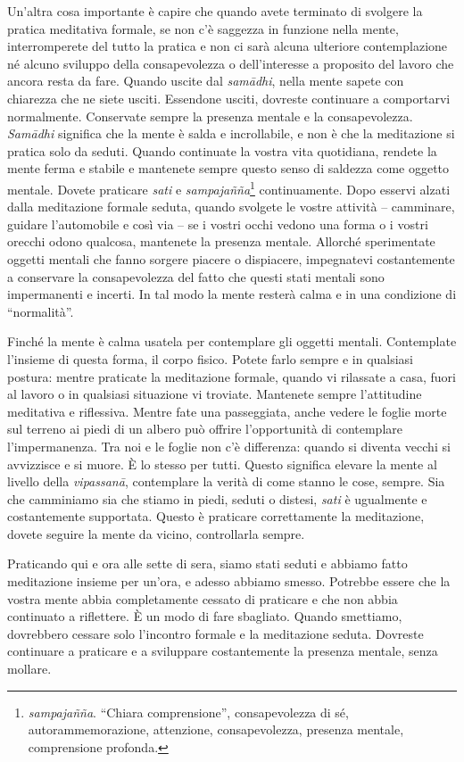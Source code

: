 Un'altra cosa importante è capire che quando avete terminato di svolgere
la pratica meditativa formale, se non c'è saggezza in funzione nella
mente, interromperete del tutto la pratica e non ci sarà alcuna
ulteriore contemplazione né alcuno sviluppo della consapevolezza o
dell'interesse a proposito del lavoro che ancora resta da fare. Quando
uscite dal \emph{samādhi}, nella mente sapete con chiarezza che ne siete
usciti. Essendone usciti, dovreste continuare a comportarvi normalmente.
Conservate sempre la presenza mentale e la consapevolezza.
\emph{Samādhi} significa che la mente è salda e incrollabile, e non è
che la meditazione si pratica solo da seduti. Quando continuate la
vostra vita quotidiana, rendete la mente ferma e stabile e mantenete
sempre questo senso di saldezza come oggetto mentale. Dovete praticare
\emph{sati} e \emph{sampajañña}\footnote{\emph{sampajañña}. ``Chiara
  comprensione'', consapevolezza di sé, autorammemorazione, attenzione,
  consapevolezza, presenza mentale, comprensione profonda.}
continuamente. Dopo esservi alzati dalla meditazione formale seduta,
quando svolgete le vostre attività -- camminare, guidare l'automobile e
così via -- se i vostri occhi vedono una forma o i vostri orecchi odono
qualcosa, mantenete la presenza mentale. Allorché sperimentate oggetti
mentali che fanno sorgere piacere o dispiacere, impegnatevi
costantemente a conservare la consapevolezza del fatto che questi stati
mentali sono impermanenti e incerti. In tal modo la mente resterà calma
e in una condizione di ``normalità''.

Finché la mente è calma usatela per contemplare gli oggetti mentali.
Contemplate l'insieme di questa forma, il corpo fisico. Potete farlo
sempre e in qualsiasi postura: mentre praticate la meditazione formale,
quando vi rilassate a casa, fuori al lavoro o in qualsiasi situazione vi
troviate. Mantenete sempre l'attitudine meditativa e riflessiva. Mentre
fate una passeggiata, anche vedere le foglie morte sul terreno ai piedi
di un albero può offrire l'opportunità di contemplare l'impermanenza.
Tra noi e le foglie non c'è differenza: quando si diventa vecchi si
avvizzisce e si muore. È lo stesso per tutti. Questo significa elevare
la mente al livello della \emph{vipassanā}, contemplare la verità di
come stanno le cose, sempre. Sia che camminiamo sia che stiamo in piedi,
seduti o distesi, \emph{sati} è ugualmente e costantemente supportata.
Questo è praticare correttamente la meditazione, dovete seguire la mente
da vicino, controllarla sempre.

Praticando qui e ora alle sette di sera, siamo stati seduti e abbiamo
fatto meditazione insieme per un'ora, e adesso abbiamo smesso. Potrebbe
essere che la vostra mente abbia completamente cessato di praticare e
che non abbia continuato a riflettere. È un modo di fare sbagliato.
Quando smettiamo, dovrebbero cessare solo l'incontro formale e la
meditazione seduta. Dovreste continuare a praticare e a sviluppare
costantemente la presenza mentale, senza mollare.

